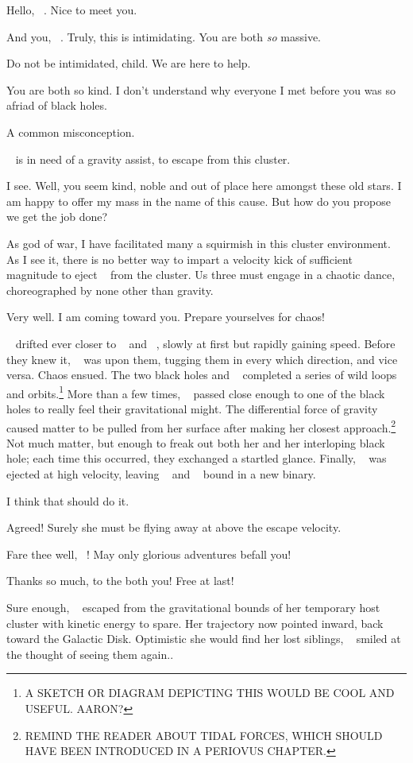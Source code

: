 \documentclass[main.tex]{subfiles}
\begin{document}
\newpara \Zeus  Hello, \rmsterope~.  Nice to meet you.

\newpara \Sterope And you, \rmzeus~.  Truly, this is intimidating.  You are both \textit{so} massive.

\newpara \Zeus Do not be intimidated, child.  We are here to help.

\newpara \Sterope You are both so kind.  I don't understand why everyone I met before you was so afriad of black holes.

\newpara \Zeus A common misconception. 

\newpara \Ares \rmsterope~ is in need of a gravity assist, to escape from this cluster.

\newpara \Zeus I see.  Well, you seem kind, noble and out of place here amongst these old stars.  I am happy to offer my mass in the name of this cause.  But how do you propose we get the job done?

\newpara \Ares As god of war, I have facilitated many a squirmish in this cluster environment.  As I see it, there is no better way to impart a velocity kick of sufficient magnitude to eject \rmsterope~ from the cluster.  Us three must engage in a chaotic dance, choreographed by none other than gravity.

\newpara \Zeus  Very well.  I am coming toward you.  Prepare yourselves for chaos!

\newpara \nar \rmzeus~ drifted ever closer to \rmsterope~ and \rmares~, slowly at first but rapidly gaining speed.  Before they knew it, \rmzeus~ was upon them, tugging them in every which direction, and vice versa.  Chaos ensued.  The two black holes and \rmmerope~ completed a series of wild loops and orbits.\footnote{A SKETCH OR DIAGRAM DEPICTING THIS WOULD BE COOL AND USEFUL.  AARON?}  More than a few times, \rmmerope~ passed close enough to one of the black holes to really feel their gravitational might.  The differential force of gravity caused matter to be pulled from her surface after making her closest approach.\footnote{REMIND THE READER ABOUT TIDAL FORCES, WHICH SHOULD HAVE BEEN INTRODUCED IN A PERIOVUS CHAPTER.} Not much matter, but enough to freak out both her and her interloping black hole; each time this occurred, they exchanged a startled glance.  Finally, \rmmerope~ was ejected at high velocity, leaving \rmares~ and \rmzeus~ bound in a new binary.    

\newpara \Ares I think that should do it.  

\newpara \Zeus Agreed!  Surely she must be flying away at above the escape velocity.  

\newpara \Ares Fare thee well, \rmsterope~!  May only glorious adventures befall you!

\newpara \Sterope Thanks so much, to the both you!  Free at last!

\newpara \nar Sure enough, \rmsterope~ escaped from the gravitational bounds of her temporary host cluster with kinetic energy to spare.  Her trajectory now pointed inward, back toward the Galactic Disk.  Optimistic she would find her lost siblings, \rmsterope~ smiled at the thought of seeing them again..
\end{document}
